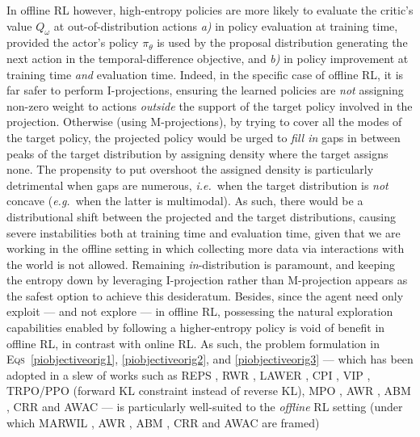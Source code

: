 In offline RL however, high-entropy policies are more likely to evaluate the critic's value $Q_\omega$
at out-of-distribution actions
\textit{a)} in policy evaluation at training time,
provided the actor's policy $\pi_\theta$ is used by the proposal distribution
generating the next action in the temporal-difference objective, and
\textit{b)} in policy improvement at training time \emph{and} evaluation time.
Indeed, in the specific case of offline RL, it is far safer to perform I-projections, ensuring
the learned policies are \emph{not} assigning non-zero weight to actions \emph{outside} the support of the
target policy involved in the projection.
Otherwise (using M-projections), by trying to cover all the modes of the target policy, the projected policy
would be urged to \emph{fill in} gaps in between peaks of the target distribution by
assigning density where the target assigns none.
The propensity to put overshoot the assigned density is particularly detrimental when gaps are numerous,
\textit{i.e.}~when the target distribution is \emph{not} concave
(\textit{e.g.}~when the latter is multimodal).
As such, there would be a distributional shift between the projected and the target distributions,
causing severe instabilities both at training time and evaluation time, given that we are working in
the offline setting in which collecting more data via interactions with the world is not allowed.
Remaining \textit{in}-distribution is paramount, and keeping the entropy down by leveraging
I-projection rather than M-projection appears as the safest option to achieve this desideratum.
Besides, since the agent need only exploit --- and not explore --- in offline RL,
possessing the natural exploration capabilities enabled by following a higher-entropy policy
is void of benefit in offline RL, in contrast with online RL.
As such, the problem formulation in \textsc{Eqs}~\ref{piobjectiveorig1},
\ref{piobjectiveorig2}, and \ref{piobjectiveorig3} --- which has been adopted in a slew of works such as
REPS \cite{Peters2010-vd},
RWR \cite{Peters2007-qb, Kober2010-hy},
LAWER \cite{Neumann2008-tm},
CPI \cite{Kakade2002-kw},
VIP \cite{Neumann2011-hn},
TRPO/PPO \cite{Schulman2015-jt, Schulman2017-ou} (forward KL constraint instead of reverse KL),
MPO \cite{Abdolmaleki2018-sp},
AWR \cite{Peng2019-hu},
ABM \cite{Siegel2020-lo},
CRR \cite{Wang2020-sr}
and AWAC \cite{Nair2020-gd}
--- is particularly well-suited to the \emph{offline} RL setting
(under which
MARWIL \cite{Wang2018-dn},
AWR \cite{Peng2019-hu},
ABM \cite{Siegel2020-lo},
CRR \cite{Wang2020-sr}
and AWAC \cite{Nair2020-gd}
are framed)

